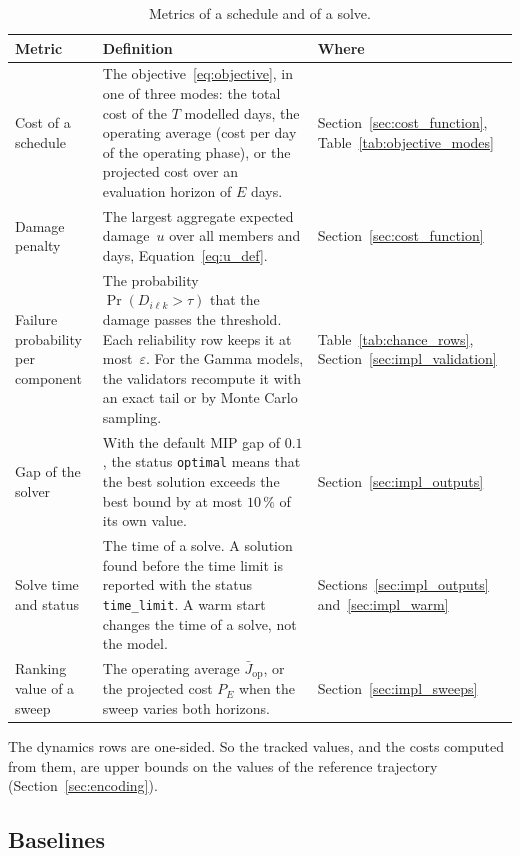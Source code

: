 \documentclass[11pt,a4paper]{article}
\theoremstyle{plain}
\theoremstyle{definition}
\theoremstyle{remark}
\begin{document}
\begin{table}[htbp]
\centering
\caption{Metrics of a schedule and of a solve.}
\label{tab:eval_metrics}
\small
\begin{tabularx}{\linewidth}{@{}>{\hsize=0.678\hsize\raggedright\arraybackslash}X>{\hsize=1.562\hsize\raggedright\arraybackslash}X>{\hsize=0.760\hsize\raggedright\arraybackslash}X@{}}
\toprule
\rowcolor{headgrey}
\textbf{Metric} & \textbf{Definition} & \textbf{Where} \\
\midrule
Cost of a schedule & The objective~\eqref{eq:objective}, in one of three modes: the total cost of the $T$ modelled days, the operating average (cost per day of the operating phase), or the projected cost over an evaluation horizon of $E$ days. & Section~\ref{sec:cost_function}, Table~\ref{tab:objective_modes} \\
Damage penalty & The largest aggregate expected damage~$u$ over all members and days, Equation~\eqref{eq:u_def}. & Section~\ref{sec:cost_function} \\
Failure probability per component & The probability $\Pr(D_{i\ell k} > \tau)$ that the damage passes the threshold. Each reliability row keeps it at most~$\varepsilon$. For the Gamma models, the validators recompute it with an exact tail or by Monte Carlo sampling. & Table~\ref{tab:chance_rows}, Section~\ref{sec:impl_validation} \\
Gap of the solver & With the default MIP gap of $0.1$, the status \texttt{optimal} means that the best solution exceeds the best bound by at most $10\,\%$ of its own value. & Section~\ref{sec:impl_outputs} \\
Solve time and status & The time of a solve. A solution found before the time limit is reported with the status \texttt{time\_limit}. A warm start changes the time of a solve, not the model. & Sections~\ref{sec:impl_outputs} and~\ref{sec:impl_warm} \\
Ranking value of a sweep & The operating average $\bar J_{\mathrm{op}}$, or the projected cost $P_E$ when the sweep varies both horizons. & Section~\ref{sec:impl_sweeps} \\
\bottomrule
\end{tabularx}
\end{table}

The dynamics rows are one-sided.
So the tracked values, and the costs computed from them, are upper bounds on the values of the reference trajectory (Section~\ref{sec:encoding}).

\subsection{Baselines}
\end{document}
